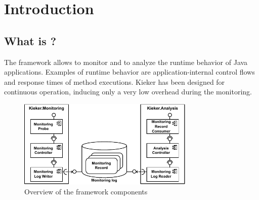 \chapter{Introduction}
\section{What is \Kieker?}

The \Kieker{} framework allows to monitor and to analyze the runtime behavior %
of Java applications. Examples of runtime behavior are application-internal %
control flows and response times of method executions. %
Kieker has been designed for continuous operation, inducing only a very low %
overhead during the monitoring. 

\begin{figure}[H]\centering
\includegraphics[width=0.75\textwidth]{images/kiekerComponentDiagram-woCloud-bw-w-record-newNames}
\caption{Overview of the framework components}
\label{Figure:KiekerComponentDiagram}
\end{figure}
		
